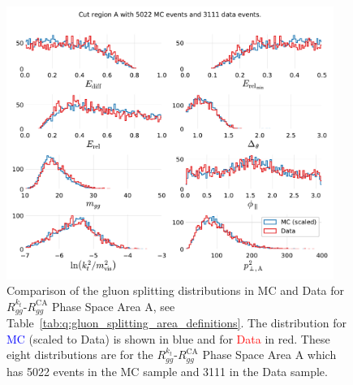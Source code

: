 \begin{figure}[h!]
  \centerfloat
  \includegraphics[width=0.95\textwidth, trim=0 0 0 0, clip, page=1]{figures/quarks/gtag-R_kt_CA_histograms-down_sample=1.00-ML_vars=vertex-selection=b-ejet_min=4-n_iter_RS_lgb=99-n_iter_RS_xgb=9-cdot_cut=0.90-version=19-njet=4.pdf}
  \caption[Gluon Splitting Distribution Comparison in MC and Data for $R_{gg}^{k_t}$-$R_{gg}^\mathrm{CA}$ Phase Space Area A]
          {Comparison of the gluon splitting distributions in MC and Data for $R_{gg}^{k_t}$-$R_{gg}^\mathrm{CA}$ Phase Space Area A, see Table~\ref{tab:q:gluon_splitting_area_definitions}. The distribution for \textcolor{blue}{MC} (scaled to Data) is shown in blue and for \textcolor{red}{Data} in red. These eight distributions are for the $R_{gg}^{k_t}$-$R_{gg}^\mathrm{CA}$ Phase Space Area A which has \num{5022} events in the MC sample and \num{3111} in the Data sample. } 
  \label{fig:q:R_kt_CA_cut_A}
\end{figure}

